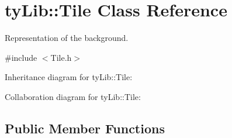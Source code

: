 \hypertarget{classty_lib_1_1_tile}{}\section{ty\+Lib\+:\+:Tile Class Reference}
\label{classty_lib_1_1_tile}


Representation of the background.  




{\ttfamily \#include $<$Tile.\+h$>$}



Inheritance diagram for ty\+Lib\+:\+:Tile\+:


Collaboration diagram for ty\+Lib\+:\+:Tile\+:
\subsection*{Public Member Functions}
